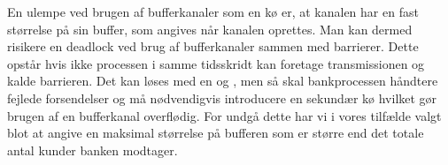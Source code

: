 En ulempe ved brugen af bufferkanaler som en kø er, at kanalen har en fast størrelse på sin buffer, som 
angives når kanalen oprettes. Man kan dermed risikere en deadlock ved brug af bufferkanaler sammen med barrierer. Dette opstår hvis ikke processen i samme 
tidsskridt kan foretage transmissionen og kalde barrieren.
Det kan løses med en  og , men så 
skal bankprocessen håndtere fejlede forsendelser og må nødvendigvis introducere en 
sekundær kø hvilket gør brugen af en bufferkanal overflødig. For undgå dette har vi i vores tilfælde valgt blot at 
angive en maksimal størrelse på bufferen som er større end det totale antal 
kunder banken modtager. 

